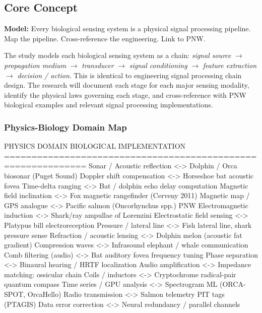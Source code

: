\documentclass[11pt,letterpaper]{article}
\begin{document}
\subsection{Core Concept}

\textbf{Model:} Every biological sensing system is a physical signal processing pipeline. Map the pipeline. Cross-reference the engineering. Link to PNW.

The study models each biological sensing system as a chain: \textit{signal source} $\to$ \textit{propagation medium} $\to$ \textit{transducer} $\to$ \textit{signal conditioning} $\to$ \textit{feature extraction} $\to$ \textit{decision / action}. This is identical to engineering signal processing chain design. The research will document each stage for each major sensing modality, identify the physical laws governing each stage, and cross-reference with PNW biological examples and relevant signal processing implementations.

\subsubsection{Physics-Biology Domain Map}

\begin{asciibox}
PHYSICS DOMAIN                    BIOLOGICAL IMPLEMENTATION
=============================================================
Sonar / Acoustic reflection   <-> Dolphin / Orca biosonar (Puget Sound)
Doppler shift compensation    <-> Horseshoe bat acoustic fovea
Time-delta ranging            <-> Bat / dolphin echo delay computation
Magnetic field inclination    <-> Fox magnetic rangefinder (Cerveny 2011)
Magnetic map / GPS analogue   <-> Pacific salmon (Oncorhynchus spp.) PNW
Electromagnetic induction     <-> Shark/ray ampullae of Lorenzini
Electrostatic field sensing   <-> Platypus bill electroreception
Pressure / lateral line       <-> Fish lateral line, shark pressure sense
Refraction / acoustic lensing <-> Dolphin melon (acoustic fat gradient)
Compression waves             <-> Infrasound elephant / whale communication
Comb filtering (audio)        <-> Bat auditory fovea frequency tuning
Phase separation              <-> Binaural hearing / HRTF localization
Audio amplification           <-> Impedance matching: ossicular chain
Coils / inductors             <-> Cryptochrome radical-pair quantum compass
Time series / GPU analysis    <-> Spectrogram ML (ORCA-SPOT, OrcaHello)
Radio transmission            <-> Salmon telemetry PIT tags (PTAGIS)
Data error correction         <-> Neural redundancy / parallel channels
\end{asciibox}
\end{document}
